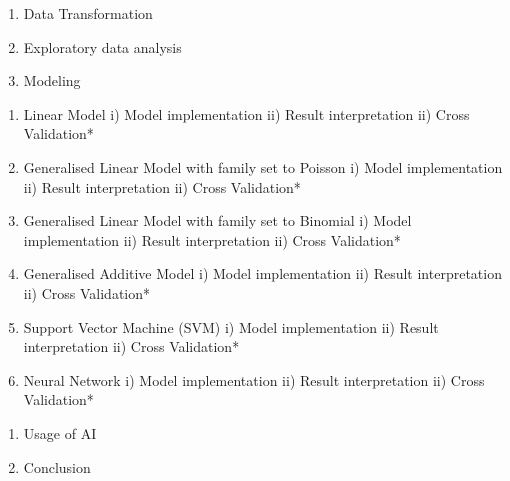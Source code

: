 \documentclass[
]{article}
\begin{document}
\begin{enumerate}
\def\labelenumi{\arabic{enumi}.}
\setcounter{enumi}{1}
\item
  Data Transformation
\item
  Exploratory data analysis
\item
  Modeling
\end{enumerate}

\begin{enumerate}
\def\labelenumi{\alph{enumi})}
\item
  Linear Model i) Model implementation ii) Result interpretation ii)
  Cross Validation*
\item
  Generalised Linear Model with family set to Poisson i) Model
  implementation ii) Result interpretation ii) Cross Validation*
\item
  Generalised Linear Model with family set to Binomial i) Model
  implementation ii) Result interpretation ii) Cross Validation*
\item
  Generalised Additive Model i) Model implementation ii) Result
  interpretation ii) Cross Validation*
\item
  Support Vector Machine (SVM) i) Model implementation ii) Result
  interpretation ii) Cross Validation*
\item
  Neural Network i) Model implementation ii) Result interpretation ii)
  Cross Validation*
\end{enumerate}

\begin{enumerate}
\def\labelenumi{\arabic{enumi}.}
\setcounter{enumi}{4}
\item
  Usage of AI
\item
  Conclusion
\end{enumerate}
\end{document}
